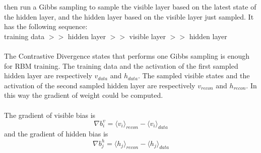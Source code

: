 \documentclass[12pt]{article}
\begin{document}
then run a Gibbs sampling to sample the visible layer based on the latest state of the hidden layer, and the hidden layer based on the visible layer just sampled. It has the following sequence:\\
training data $>>$ hidden layer $>>$ visible layer $>>$  hidden layer\\
\\
The Contrastive Divergence states that performs one Gibbs sampling is enough for RBM training. The training data and the activation of the first sampled hidden layer are respectively $v_{data}$ and $h_{data}$. The sampled visible states and the activation of the second sampled hidden layer are respectively $v_{recon}$ and $h_{recon}$. In this way the gradient of weight could be computed.\\
\\
The gradient of visible bias is \begin{equation}
\nabla b^v_{i} = \langle v_i\rangle_{recon} - \langle v_i\rangle_{data}
\end{equation}
and the gradient of hidden bias is \begin{equation}
\nabla b^h_{j} = \langle h_j\rangle_{recon} - \langle h_j\rangle_{data}
\end{equation}
\end{document}
